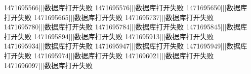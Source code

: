 1471695566|||数据库打开失败
1471695576|||数据库打开失败
1471695650|||数据库打开失败
1471695665|||数据库打开失败
1471695737|||数据库打开失败
1471695780|||数据库打开失败
1471695784|||数据库打开失败
1471695845|||数据库打开失败
1471695894|||数据库打开失败
1471695913|||数据库打开失败
1471695934|||数据库打开失败
1471695947|||数据库打开失败
1471695949|||数据库打开失败
1471695974|||数据库打开失败
1471696021|||数据库打开失败
1471696097|||数据库打开失败
